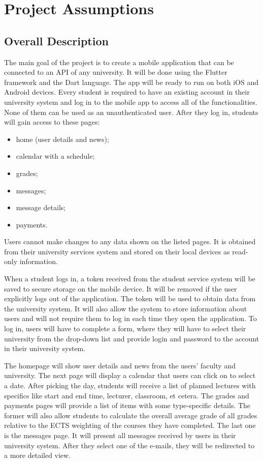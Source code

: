 \chapter{Project Assumptions}
\section{Overall Description}

The main goal of the project is to create a mobile application that can be connected to an API of any university. It will be done using the Flutter framework and the Dart language. The app will be ready to run on both iOS and Android devices. Every student is required to have an existing account in their university system and log in to the mobile app to access all of the functionalities. None of them can be used as an unauthenticated user. After they log in, students will gain access to these pages:

\begin{multicols}{2}
\begin{itemize}
    \item home (user details and news);
    \item calendar with a schedule;
    \item grades;
    \item messages;
    \item message details;
    \item payments.
\end{itemize}
\end{multicols}

Users cannot make changes to any data shown on the listed pages. It is obtained from their university services system and stored on their local devices as read-only information.

When a student logs in, a token received from the student service system will be saved to secure storage on the mobile device. It will be removed if the user explicitly logs out of the application. The token will be used to obtain data from the university system. It will also allow the system to store information about users and will not require them to log in each time they open the application. To log in, users will have to complete a form, where they will have to select their university from the drop-down list and provide login and password to the account in their university system.

The homepage will show user details and news from the users' faculty and university. The next page will display a calendar that users can click on to select a date. After picking the day, students will receive a list of planned lectures with specifics like start and end time, lecturer, classroom, et cetera. The grades and payments pages will provide a list of items with some type-specific details. The former will also allow students to calculate the overall average grade of all grades relative to the ECTS weighting of the courses they have completed. The last one is the messages page. It will present all messages received by users in their university system. After they select one of the e-mails, they will be redirected to a more detailed view.

